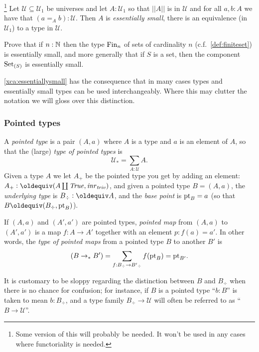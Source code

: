 \begin{definition}
\begin{xca}
 [\footnote{This tries to say that, nonfunctorially, a space is the disjoint union of its components.  Don't think we need it so it can propably be thrown away.}Assuming the appropriate form of axiom of choice \footnote{someone insert our choice}, prove that the path components define a family $A\to\mathcal U$ factoring as $A\to||A||$ making sense of the equation ``$||A=\sum_{[a]:||A||}A_{[a]}||$''.]
\end{xca}
\begin{xca}\label{xca:essentiallysmall} \footnote{Some version of this will probably be needed.  It won't be used in any cases where functoriality is needed.}
  Let $\mathcal U\subseteq\mathcal U_1$ be universes and let $A:\mathcal U_1$ so that $||A||$ is in $\mathcal U$ and for all $a,b:A$ we have that $(a=_Ab):\mathcal U$.  Then $A$ is \emph{essentially small}, \ie there is an equivalence (in $\mathcal U_1$) to a type in $\mathcal U$.  

Prove that if $n:\mathbb{N}$ then the type $\mathrm{Fin}_n$ of sets of cardinality $n$  (c.f.~\cref{def:finiteset}) is essentially small, and more generally that if $S$ is a set, then the component $\mathord{\mathrm{Set}}_{(S)}$ is essentially small.  
\end{xca}
\cref{xca:essentiallysmall} has the consequence that in many cases types and essentially small types can be used interchangeably.  Where this may clutter the notation we will gloss over this distinction.

\subsubsection{Pointed types}
\label{sec:poitedtypes}
\begin{definition}\label{def:pointedtypes}
  A \emph{pointed type} is a pair $(A,a)$ where $A$ is a type and $a$ is an element of $A$, so that the (large) \emph{type of pointed types} is
$$\mathcal U_*=\sum_{A:\mathcal U}A.$$
Given a type $A$ we let $A_+$ be the pointed type you get by adding an element: $A_+\defequi(A\coprod\true,\inr{\triv})$, and given a pointed type $B=(A,a)$, the \emph{underlying type} is $B_\div\defequi A$, and the \emph{base point} is ${\mathord{\mathrm{pt}}}_B=a$ (so that $B\oldequiv (B_\div,\pt_B)$).  

If $(A,a)$ and $(A',a')$ are pointed types,  \emph{pointed map} from  $(A,a)$ to $(A',a')$ is a map $f:A\to A'$ together with an element $p:f(a)=a'$.  In other words, the \emph{type of pointed maps} from a pointed type $B$ to another $B'$ is
$$(B\to_*B')=\sum_{f:B_\div\to B'{}_\div}f({\mathord{\mathrm{pt}}}_B)={\mathord{\mathrm{pt}}}_{B'}.$$
\end{definition}
\begin{remark}
  It is customary to be sloppy regarding the distinction between $B$ and $B_\div$  when there is no chance for confusion; for instance, if $B$ is a pointed type ``$b:B$'' is taken to mean $b:B_\div$, and a type family $B_\div\to\mathcal U$ will often be referred to as ``$B\to\mathcal U$''.
\end{remark}


\end{definition}
